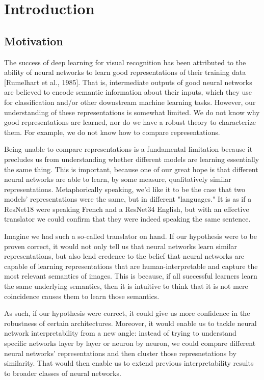 \documentclass{article} %
\begin{document}
\section{Introduction}
\subsection{Motivation}
The success of deep learning for visual recognition has been attributed to the ability of neural networks to learn
good representations of their training data [Rumelhart et al., 1985]. That is, intermediate outputs of good neural networks 
are believed to encode semantic information about their inputs, which they use for classification and/or other
downstream machine learning tasks. However, our understanding of these representations is somewhat limited. We do not
know why good representations are learned, nor do we have a robust theory to characterize them. For example, we do not
know how to compare representations.

Being unable to compare representations is a fundamental limitation because it precludes us from understanding whether
different models are learning essentially the same thing. This is important, because one of our great hope is that
different neural networks are able to learn, by some measure, qualitatively similar representations. Metaphorically speaking,
we'd like it to be the case that two models' representations were the same, but in different "languages." It is as if
a ResNet18 were speaking French and a ResNet34 English, but with an effective translator we could confirm that they were
indeed speaking the same sentence.

Imagine we had such a so-called translator on hand. If our hypothesis were to be proven correct,
it would not only tell us that neural networks learn similar representations, but also lend credence to the belief that
neural networks are capable of learning representations that are human-interpretable and capture the most relevant
semantics of images. This is because, if all successful learners learn the same underlying semantics, then it
is intuitive to think that it is not mere coincidence causes them to learn those semantics.

As such, if our hypothesis were correct, it could give us more confidence in the robustness of certain architectures.
Moreover, it would enable us to tackle neural network interpretability from a new angle: instead of trying to 
understand specific networks layer by layer or neuron by neuron, we could compare different neural networks'
representations and then cluster those represnetations by similarity. 
That would then enable us to extend previous interpretability results to broader classes of neural networks.
\end{document}
